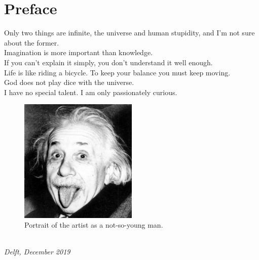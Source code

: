 \chapter*{Preface}

Only two things are infinite, the universe and human stupidity, and I'm not sure about the former. \\
Imagination is more important than knowledge. \\
If you can't explain it simply, you don't understand it well enough. \\
Life is like riding a bicycle. To keep your balance you must keep moving. \\
God does not play dice with the universe. \\
I have no special talent. I am only passionately curious.

\begin{figure}[ht!]
\centering
\includegraphics[width=0.5\textwidth]{./preface/figures/Einstein_picture.jpg}
\caption[Artist's portrait]{Portrait of the artist as a not-so-young man.}
\label{fig:einstein}
\end{figure}

\begin{flushright}
{\makeatletter\itshape
    \@firstname\ \@lastname \\
    Delft, December 2019
\makeatother}
\end{flushright}

